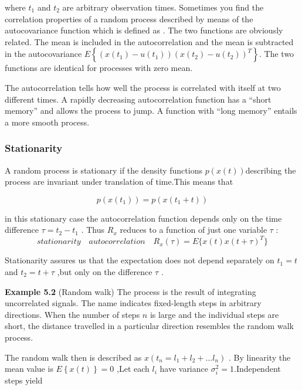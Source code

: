 	  
	  where $ t_{1} $ and $ t_{2} $ are arbitrary observation times. Sometimes you find the correlation properties of a random process described by means of the autocovariance function which is defined as . The two functions are obviously related. The mean is included in the autocorrelation and the mean is subtracted in the autocovariance $ E\left\lbrace(x(t_{1})-u(t_{1}))(x(t_{2})-u(t_{2}))^{T} \right\rbrace  $. The two functions are identical for processes with zero mean. 
	  
	  The autocorrelation tells how well the process is correlated with itself at two different times. A rapidly decreasing autocorrelation function has a “short memory” and allows the process to jump. A function with “long memory” entails a more smooth process.
	  
	   \subsubsection { Stationarity} 
	   
	   A random process is stationary if the density functions $ p(x(t)) $describing the process are invariant under translation of time.This means that 
	   
	   \[ p(x(t_{1})) = p(x(t_{1}+t))  \]
	   
	   in this stationary case the autocorrelation function depends only on the time difference $ \tau=t_{2}-t_{1} $ . Thus $ R_{x} $ reduces to a function of just one variable $ \tau $ :
	   \begin{equation}\label{5.9}
	   stationarity \quad autocorrelation \quad R_{x}(\tau) = E\{x(t)x(t+\tau)^{T}\}
	   \end{equation}
	     
	   
	   Stationarity assures us that the expectation does not depend separately on $ t_{1}=t $ and $ t_{2}=t+\tau $ ,but only on the difference $ \tau $ .
	   
	   \textbf{Example 5.2} (Random walk) The process is the result of integrating uncorrelated signals. The name indicates fixed-length steps in arbitrary directions. When the number of steps $ n $ is large and the individual steps are short, the distance travelled in a particular direction resembles the random walk process. 
	   
	   The random walk then is described as $ x(t_{n}=l_{1}+l_{2}+...l_{n}) $ . By linearity the mean value is $ E\left\lbrace x(t)\right\rbrace = 0  $ ,Let each $ l_{i} $ have variance $ \sigma_{i}^{2}=1 $.Independent steps yield 
	   
